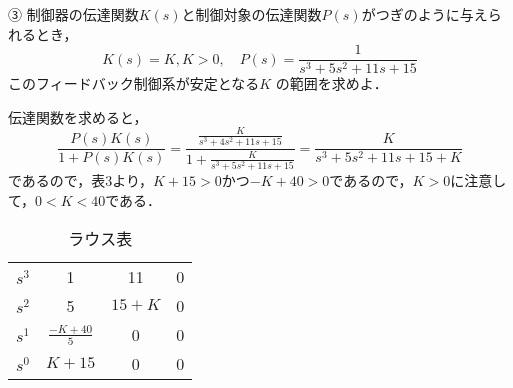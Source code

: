 ③ 制御器の伝達関数$K(s)$と制御対象の伝達関数$P(s)$がつぎのように与えられるとき，
$$
K(s)=K, K>0, \quad P(s)=\frac{1}{s^3+5 s^2+11 s+15}
$$
このフィードバック制御系が安定となる$K$ の範囲を求めよ．


伝達関数を求めると，
$$
\frac{P(s) K(s)}{1+P(s) K(s)}=\frac{\frac{K}{s^3+4 s^2+11 s+15}}{1+\frac{K}{s^3+5 s^2+11 s+15}}=\frac{K}{s^3+5 s^2+11 s+15+K}
$$
であるので，表3より，$K+15>0$かつ$-K+40>0$であるので，$K>0$に注意して，$0<K<40$である．

\begin{table}[H]
    \centering
    \begin{tabular}{c|ccc}
        \hline
        $s^3$ & 1 & 11 & 0 \\
        $s^2$ & 5 & $15+K$ & 0 \\
        $s^1$ & $\frac{-K+40}{5}$ & 0 & 0 \\
        $s^0$ & $K+15$ & 0 & 0 \\ \hline
        
    \end{tabular}
    \caption{ラウス表}
\end{table}